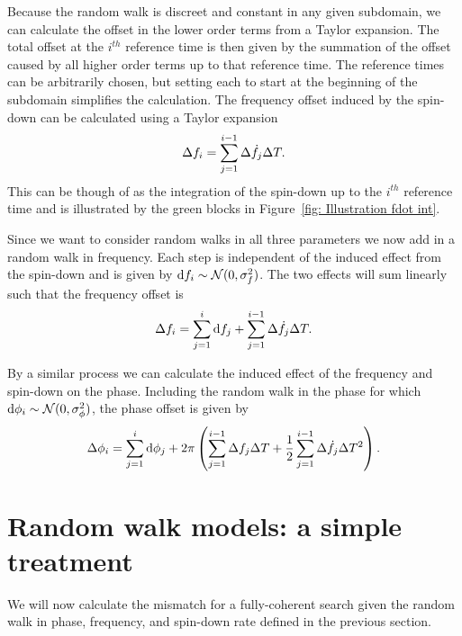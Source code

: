 \documentclass[../full_thesis/full_thesis.tex]{subfiles}
\begin{document}
Because the random walk is discreet and constant in any given subdomain, we can
calculate the offset in the lower order terms from a Taylor expansion. The
total offset at the  $i^{th}$ reference time is then given by the summation of
the offset caused by all higher order terms up to that reference time. The
reference times can be arbitrarily chosen, but setting each to start at the
beginning of the subdomain simplifies the calculation. 
The frequency offset induced by the spin-down can be
calculated using a Taylor expansion
\begin{equation}
\Delta f_{i} = \sum_{j=1}^{i-1}\Delta\dot{f}_{j} \Delta T .
\label{eqn: f offset induced} 
\end{equation}
This can be though of as the integration of the spin-down up to the $i^{th}$
reference time and is illustrated by the green blocks in Figure~\ref{fig:
Illustration fdot int}. 

Since we want to consider random walks in all three parameters we now add in a
random walk in frequency. Each step is independent of the induced effect from
the spin-down and is given by \mbox{$\mathrm{d} f_{i} \sim \mathcal{N}(0, \sigma_{f}^{2})$}. The two
effects will sum linearly such that the frequency offset is
\begin{equation}
\Delta f_{i} = \sum_{j=1}^{i}\mathrm{d} f_{j} + \sum_{j=1}^{i-1}\Delta\dot{f}_{j} \Delta T.
\label{eqn: f offset} 
\end{equation}

By a similar process we can calculate the induced effect of the frequency and
spin-down on the phase. Including the random walk in the phase
for which $\mathrm{d} \phi_i \sim \mathcal{N}(0, \sigma_{\phi}^{2})$, the phase offset is given by
\begin{equation}
\Delta\phi_{i}  =  \sum_{j=1}^{i}\mathrm{d} \phi_{j} 
+ 2\pi\left(\sum_{j=1}^{i-1}\Delta f_{j}\Delta T 
+ \frac{1}{2}\sum_{j=1}^{i-1}\Delta \dot{f}_{j}\Delta T^{2}\right).
\label{eqn: phi offset}
\end{equation}



\section{Random walk models: a simple treatment}
\label{sec: random walk models part I}
We will now calculate the mismatch for a fully-coherent search given the
random walk in phase, frequency, and spin-down rate defined in the previous
section.
\end{document}
